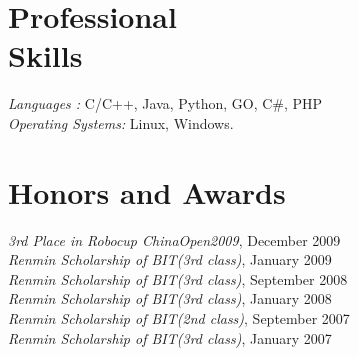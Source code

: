\documentclass[margin]{res}
\begin{document}
\begin{resume}
 \section{Professional \\ Skills} {\sl Languages :} C/C++, Java, Python, GO, C\#, PHP \\
                {\sl Operating Systems:} Linux, Windows.
 
\section{Honors and Awards }             
             {\it 3rd Place in Robocup ChinaOpen2009}, 	December	2009 \\             			
			 {\it Renmin Scholarship of BIT(3rd class)}, January	2009 \\            	
			 {\it Renmin Scholarship of BIT(3rd class)}, September	2008 \\            
			 {\it Renmin Scholarship of BIT(3rd class)}, January	2008 \\            
			 {\it Renmin Scholarship of BIT(2nd class)}, September	2007 \\  
			 {\it Renmin Scholarship of BIT(3rd class)}, January	2007 			 			 
\end{resume}
\end{document}
